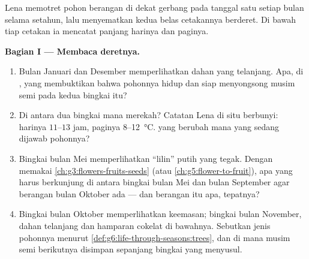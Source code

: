 \begin{problem}\label{pb:g6:life-through-seasons:1}
Lena memotret pohon berangan di dekat gerbang pada tanggal satu setiap
bulan selama setahun, lalu menyematkan kedua belas cetakannya
berderet. Di bawah tiap cetakan ia mencatat panjang harinya dan 
paginya.

\medskip\noindent\textbf{Bagian I --- Membaca deretnya.}
\begin{enumerate}
  \item Bulan Januari dan Desember memperlihatkan dahan yang telanjang.
        Apa, di , yang membuktikan bahwa pohonnya hidup dan
        siap menyongsong musim semi pada kedua bingkai itu?
  \item Di antara dua bingkai mana  merekah? Catatan Lena di
        situ berbunyi: harinya
        $11$--$13$ jam, paginya
        $8$--\qty{12}{\degreeCelsius}.  yang berubah mana yang
        sedang dijawab pohonnya?
  \item Bingkai bulan Mei memperlihatkan ``lilin''  putih yang
        tegak. Dengan memakai \cref{ch:g3:flowers-fruits-seeds} (atau
        \cref{ch:g5:flower-to-fruit}), apa yang harus berkunjung di
        antara bingkai bulan Mei dan bulan September agar  berangan
        bulan Oktober ada --- dan  berangan itu apa, tepatnya?
  \item Bingkai bulan Oktober memperlihatkan  keemasan; bingkai
        bulan November, dahan telanjang dan hamparan cokelat di
        bawahnya. Sebutkan jenis pohonnya menurut
        \cref{def:g6:life-through-seasons:trees}, dan di mana musim
        semi berikutnya disimpan sepanjang bingkai yang menyusul.
\end{enumerate}


\end{problem}
